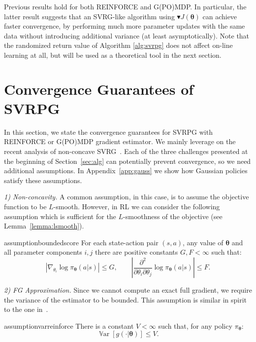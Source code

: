 \documentclass{article}
\theoremstyle{remark}
\theoremstyle{definition}
\DeclareMathOperator*{\Var}{\mathbb{V}ar}
\newcommand{\vtheta}{\boldsymbol{\theta}}
\newcommand{\pol}{\pi_{\vtheta}}
\newcommand{\gradBlack}[1]{\blacktriangledown J(#1)}
\newcommand{\VARRF}{V}
\newcommand{\GRADLOG}{G}
\newcommand{\HESSLOG}{F}
\begin{document}
Previous results hold for both REINFORCE and G(PO)MDP.
In particular, the latter result suggests that an SVRG-like algorithm using $\gradBlack{\vtheta}$ can achieve faster convergence, by performing much more parameter updates with the same data without introducing additional variance (at least asymptotically).
{\color{blue}Note that the randomized return value of Algorithm \ref{alg:svrpg} does not affect on-line learning at all, but will be used as a theoretical tool in the next section.}

\section{Convergence Guarantees of SVRPG}\label{sec:conv}
In this section, we state the convergence guarantees for SVRPG with REINFORCE or G(PO)MDP gradient estimator.
We mainly leverage on the recent analysis of non-concave SVRG~\cite{reddi2016stochastic,allen2016variance}.
Each of the three challenges presented at the beginning of Section~\ref{sec:alg} can potentially prevent convergence, so we need additional assumptions.
In Appendix~\ref{app:gauss} we show how Gaussian policies satisfy these assumptions.

\textit{1) Non-concavity.} A common assumption, in this case, is to assume the objective function to be $L$-smooth.
However, in RL we can consider the following assumption which is sufficient for the $L$-smoothness of the objective (see Lemma~\ref{lemma:lsmooth}).
	\begin{restatable}{assumption}{boundedscore}\label{ass:bounded_score}
		For each state-action pair $(s,a)$, any value of $\vtheta$ and all parameter components $i,j$ there are positive constants $G,F<\infty$ such that:
\[
		\left|\nabla_{\theta_i}\log\pi_{\vtheta}(a\vert s)\right| \leq \GRADLOG, \qquad
        \left|\frac{\partial^2}{\partial\theta_i\partial\theta_j}\log\pi_{\vtheta}(a \vert s)\right| \leq \HESSLOG.
\]
	\end{restatable}

\textit{2) FG Approximation.}
Since we cannot compute an exact full gradient, we require the variance of the estimator to be bounded.
This assumption is similar in spirit to the one in~\citep{harikandeh2015stopwasting}.
	\begin{restatable}{assumption}{varreinforce}\label{ass:REINFORCE}
		There is a constant $V<\infty$ such that, for any policy $\pol$:
		\[
			\Var\left[g(\cdot\vert\vtheta)\right] \leq \VARRF.
		\]
	\end{restatable}
\end{document}
